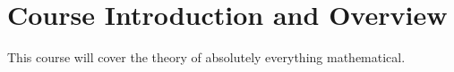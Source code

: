 \chapter*{Course Introduction and Overview}
\thispagestyle{empty}


This course will cover the theory of absolutely everything mathematical.